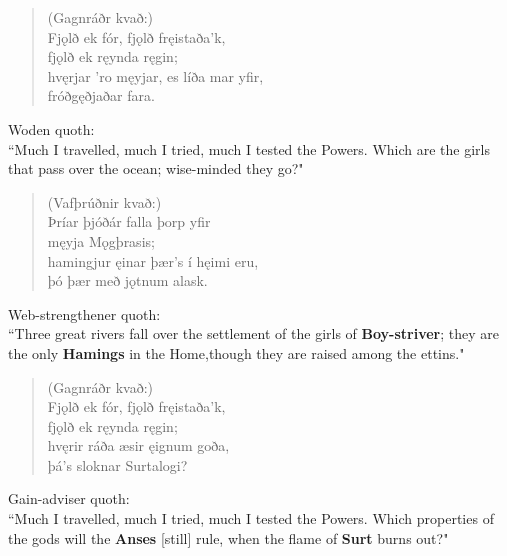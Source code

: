 \begin{verse}
(Gagnráðr kvað:) \\%
\bva Fjǫlð ek fór, \hld fjǫlð fręistaða'k, \\%
\ind fjǫlð ek ręynda ręgin; \\%
hvęrjar 'ro męyjar, \hld es líða mar yfir, \\%
\ind fróðgęðjaðar fara.\\%
\end{verse}

\bvb Woden quoth: \\ “Much I travelled, much I tried, much I tested the Powers. Which are the girls that pass over the ocean; wise-minded they go?" \\

\begin{verse}
(Vafþrúðnir kvað:) \\%
\bva Þríar þjóðár \hld falla þorp yfir \\%
\ind męyja Mǫgþrasis; \\%
hamingjur ęinar \hld þær's í hęimi eru, \\%
\ind þó þær með jǫtnum alask.\\%
\end{verse}

\bvb Web-strengthener quoth: \\ “Three great rivers fall over the settlement of the girls of \textbf{Boy-striver}; they are the only \textbf{Hamings} in the Home,\footnotemark[99] though they are raised among the ettins\footnotemark[100]." \\

\begin{verse}
(Gagnráðr kvað:) \\%
\bva Fjǫlð ek fór, \hld fjǫlð fręistaða'k, \\%
\ind fjǫlð ek ręynda ręgin; \\%
hvęrir ráða æsir \hld ęignum goða, \\%
\ind þá's sloknar Surtalogi?\\%
\end{verse}

\bvb Gain-adviser quoth: \\ “Much I travelled, much I tried, much I tested the Powers. Which properties of the gods will the \textbf{Anses} [still] rule\footnotemark[105], when the flame of \textbf{Surt} burns out?" \\

